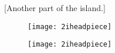 
\cleardoubleoddpage
{}
[Another part of the island.]


\begin{letter}
	\begin{figure}[t!]
		\centering
		\texttt{[image: 2iheadpiece]}
	\end{figure}
\end{letter}

\begin{a4}
	\begin{figure}[t!]
		\centering
		\texttt{[image: 2iheadpiece]}
	\end{figure}
\end{a4}



